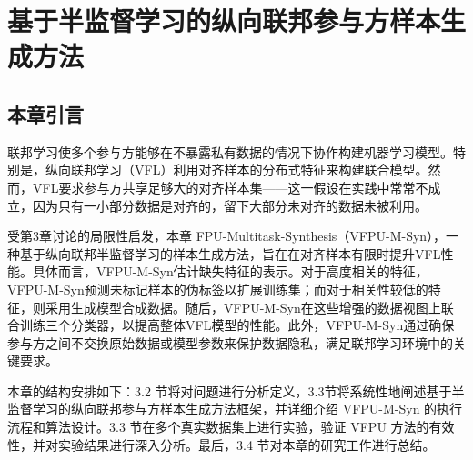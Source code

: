 \chapter{基于半监督学习的纵向联邦参与方样本生成方法}
\thispagestyle{others}
\pagestyle{others}
\xiaosi

\section{本章引言}
联邦学习使多个参与方能够在不暴露私有数据的情况下协作构建机器学习模型。特别是，纵向联邦学习（VFL）利用对齐样本的分布式特征来构建联合模型。然而，VFL要求参与方共享足够大的对齐样本集——这一假设在实践中常常不成立，因为只有一小部分数据是对齐的，留下大部分未对齐的数据未被利用。

受第3章讨论的局限性启发，本章
FPU-Multitask-Synthesis（VFPU-M-Syn），一种基于纵向联邦半监督学习的样本生成方法，旨在在对齐样本有限时提升VFL性能。具体而言，VFPU-M-Syn估计缺失特征的表示。对于高度相关的特征，VFPU-M-Syn预测未标记样本的伪标签以扩展训练集；而对于相关性较低的特征，则采用生成模型合成数据。随后，VFPU-M-Syn在这些增强的数据视图上联合训练三个分类器，以提高整体VFL模型的性能。此外，VFPU-M-Syn通过确保参与方之间不交换原始数据或模型参数来保护数据隐私，满足联邦学习环境中的关键要求。

本章的结构安排如下：3.2 节将对问题进行分析定义，3.3节将系统性地阐述基于半监督学习的纵向联邦参与方样本生成方法框架，并详细介绍 VFPU-M-Syn 的执行流程和算法设计。3.3 节在多个真实数据集上进行实验，验证 VFPU 方法的有效性，并对实验结果进行深入分析。最后，3.4 节对本章的研究工作进行总结。

